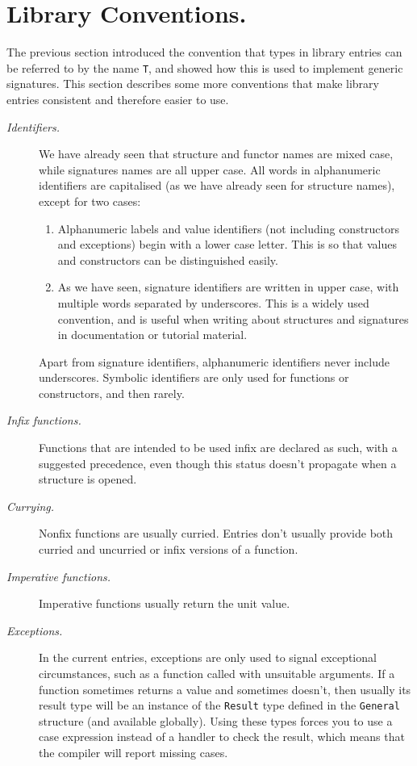 \section{Library Conventions.}

The previous section introduced the convention that types in
library	entries can be referred to by the name {\tt T}, and showed how
this is used to implement generic signatures.  This section describes
some more conventions that make library entries
consistent and therefore easier to use.

\begin{description}
  \item[\em Identifiers.]
	We have already seen that structure and functor names are mixed
	case, while signatures names are all upper case.
	All words in alphanumeric identifiers are capitalised (as we have
	already seen for structure names), except for two cases:
   \begin{enumerate}
    \item 
	Alphanumeric labels and value identifiers (not including
	constructors and exceptions) begin with a lower case letter.
	This is so that values and constructors can be distinguished
	easily.
    \item As we have seen, signature identifiers are written in upper
	case, with multiple words separated by underscores.  This is
	a widely used convention, and is useful when writing about
	structures and signatures in documentation or tutorial material.
   \end{enumerate} 	
	Apart from signature identifiers, alphanumeric identifiers never
	include underscores.  Symbolic identifiers are only used for
	functions or constructors, and then rarely.

  \item[\em Infix functions.]
	Functions that are intended to be used infix are declared as
	such, with a suggested precedence, even though this status
	doesn't propagate when a structure is opened.

  \item[\em Currying.]
	Nonfix functions are usually curried.  Entries don't usually
	provide both curried and uncurried or infix versions of a function.

  \item[\em Imperative functions.]
	Imperative functions usually return the unit value.

  \item[\em Exceptions.]
	In the current entries, exceptions are only used to signal
	exceptional circumstances, such as
	a function called with unsuitable arguments.  If a function
	sometimes returns a value and sometimes doesn't, then usually
	its result type will be an instance of the {\tt Result} type
	defined in the {\tt General} structure (and available globally).
	Using these
	types forces you to use a case expression instead of a handler to
	check the result, which means that the compiler will report missing
	cases.


\end{description}
